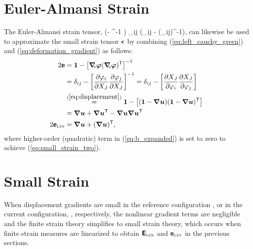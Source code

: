 \section{Euler-Almansi Strain}
The Euler-Almansi strain tensor,
\be
 \tebold 
 \half (\vid - \tbbold^{-1} )
 \;\; \Longleftrightarrow \;\;
 \te_{ij} 
 \half \left(\delta_{ij} - (\tb_{ij})^{-1}\right),
\ee
can likewise be used to approximate the small strain tensor
$\mbox{\boldmath $\epsilon$}$ by combining (\ref{eq:left_cauchy_green}) and
(\ref{eq:deformation_gradient}) as follows:
\begin{align}
 2 \tebold &=
     \vid - \left[ \Grad \vvarphi 
     (\Grad \vvarphi)\transpose \right]^{-1} \nonumber \\
     &= 
     \delta_{ij} 
       - \left[ \frac{\partial \varphi_i}{\partial X_J}
                \frac{\partial \varphi_j}{\partial X_J}
         \right]^{-1} %
     =
      \delta_{ij} 
       - \left[ \frac{\partial X_J}{\partial \varphi_i}
                \frac{\partial X_J}{\partial \varphi_j}
         \right] 
	    \nonumber \\ 
     &\overset{(\ref{eq:displacement})}{=}
      \vid 
       - \left[
                (\vid - \grad \vu) (\vid - \grad \vu)\transpose
         \right]
	   \nonumber \\ 
     &=
     \grad \vu + \grad \vu\transpose - 
     \grad \vu \grad \vu\transpose 
     \label{eq:b_expanded} \\
 2 \tebold_{\tiny \mbox{LIN}} 
     &=
     \grad \vu + (\grad \vu)\transpose,
     \label{eq:small_strain_two}
\end{align}
where higher-order (quadratic) term in (\ref{eq:b_expanded}) is set
to zero to achieve (\ref{eq:small_strain_two}).

\section{Small Strain}
When displacement gradients are small in the reference configuration 
\be
\Grad \vu {},
\ee 
or in the current configuration, 
\be
\grad \vu {},
\ee
respectively, the nonlinear gradient terms 
are negligible and the finite strain theory simplifies to small strain
theory, which occurs when finite strain measures are linearized to 
obtain
$\mbox{\sffamily\bfseries E}_{\tiny \mbox{LIN}}$
and 
$\mbox{\sffamily\bfseries e}_{\tiny \mbox{LIN}}$
in the previous sections.

